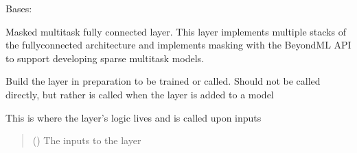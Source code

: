 \documentclass[letterpaper,10pt,english]{sphinxmanual}
\begin{document}
\begin{fulllineitems}
\label{\detokenize{beyondml.tflow.layers:beyondml.tflow.layers.MultiMaskedDense.MultiMaskedDense}}
\pysigstartsignatures
{}
\pysigstopsignatures
\sphinxAtStartPar
Bases: 

\sphinxAtStartPar
Masked multitask fully connected layer. This layer implements multiple stacks
of the fully\sphinxhyphen{}connected architecture and implements masking with the BeyondML API
to support developing sparse multitask models.

\begin{fulllineitems}
\label{\detokenize{beyondml.tflow.layers:beyondml.tflow.layers.MultiMaskedDense.MultiMaskedDense.build}}
\pysigstartsignatures
{}
\pysigstopsignatures
\sphinxAtStartPar
Build the layer in preparation to be trained or called. Should not be called directly,
but rather is called when the layer is added to a model

\end{fulllineitems}


\begin{fulllineitems}
\label{\detokenize{beyondml.tflow.layers:beyondml.tflow.layers.MultiMaskedDense.MultiMaskedDense.call}}
\pysigstartsignatures
{}
\pysigstopsignatures
\sphinxAtStartPar
This is where the layer’s logic lives and is called upon inputs
\begin{quote}\begin{description}
\sphinxAtStartPar
{} () \textendash{} The inputs to the layer


\end{description}
\end{quote}
\end{fulllineitems}
\end{fulllineitems}
\end{document}
